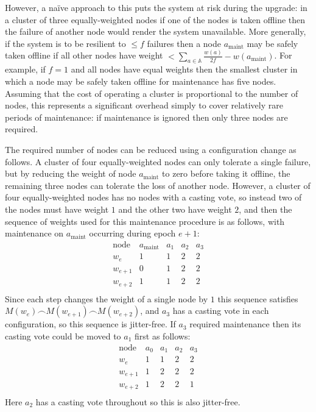 \documentclass[journal]{IEEEtran}
\begin{document}
However, a na\"ive approach to this puts the system at risk during the upgrade:
in a cluster of three equally-weighted nodes if one of the nodes is taken
offline then the failure of another node would render the system unavailable.
More generally, if the system is to be resilient to $\le f$ failures then a
node $a_{\textrm{maint}}$ may be safely taken offline if all other nodes have
weight $< \sum_{a \in \mathbb A} \frac{w(a)}{2f} - w(a_{\textrm{maint}})$. For
example, if $f = 1$ and all nodes have equal weights then the smallest cluster
in which a node may be safely taken offline for maintenance has five nodes.
Assuming that the cost of operating a cluster is proportional to the number of
nodes, this represents a significant overhead simply to cover relatively rare
periods of maintenance: if maintenance is ignored then only three nodes are
required.

The required number of nodes can be reduced using a configuration change as
follows. A cluster of four equally-weighted nodes can only tolerate a single
failure, but by reducing the weight of node $a_{\textrm{maint}}$ to zero before
taking it offline, the remaining three nodes can tolerate the loss of another
node. However, a cluster of four equally-weighted nodes has no nodes with a
casting vote, so instead two of the nodes must have weight $1$ and the other
two have weight $2$, and then the sequence of weights used for this maintenance
procedure is as follows, with maintenance on $a_{\textrm{maint}}$ occurring
during epoch ${e+1}$:
\[\begin{array}{rcccc}
\textrm{node}&a_{\textrm{maint}}&a_1&a_2&a_3 \\
w_e&1&1&2&2\\
w_{e+1}&0&1&2&2\\
w_{e+2}&1&1&2&2\\
\end{array}\]
Since each step changes the weight of a single node by $1$ this sequence
satisfies $M(w_e) \frown M(w_{e+1}) \frown M(w_{e+2})$, and $a_3$ has a casting
vote in each configuration, so this sequence is jitter-free.  If $a_3$ required
maintenance then its casting vote could be moved to $a_1$ first as follows:
\[\begin{array}{rcccc}
\textrm{node}&a_0&a_1&a_2&a_3 \\
w_e&1&1&2&2\\
w_{e+1}&1&2&2&2\\
w_{e+2}&1&2&2&1\\
\end{array}\]
Here $a_2$ has a casting vote throughout so this is also jitter-free.
\end{document}
